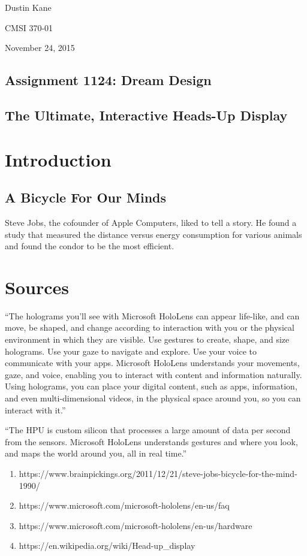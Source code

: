 \documentclass[a4paper,12pt]{article}
\begin{document}
Dustin Kane

CMSI 370-01

November 24, 2015

\begin{center}
\section*{Assignment 1124: Dream Design}
\subsection*{The Ultimate, Interactive Heads-Up Display}
\end{center}

\section{Introduction}
\subsection{A Bicycle For Our Minds}

Steve Jobs, the cofounder of Apple Computers, liked to tell a story. He found a study that measured the distance versus energy consumption for various animals and found the condor to be the most efficient. 

\section{Sources}

``The holograms you’ll see with Microsoft HoloLens can appear life-like, and can move, be shaped, and change according to interaction with you or the physical environment in which they are visible. Use gestures to create, shape, and size holograms. Use your gaze to navigate and explore. Use your voice to communicate with your apps. Microsoft HoloLens understands your movements, gaze, and voice, enabling you to interact with content and information naturally. Using holograms, you can place your digital content, such as apps, information, and even multi-dimensional videos, in the physical space around you, so you can interact with it.''

``The HPU is custom silicon that processes a large amount of data per second from the sensors. Microsoft HoloLens understands gestures and where you look, and maps the world around you, all in real time.''
\begin{enumerate}
    \item https://www.brainpickings.org/2011/12/21/steve-jobs-bicycle-for-the-mind-1990/
	\item https://www.microsoft.com/microsoft-hololens/en-us/faq
	\item https://www.microsoft.com/microsoft-hololens/en-us/hardware
	\item https://en.wikipedia.org/wiki/Head-up\_display
\end{enumerate}
\end{document}

